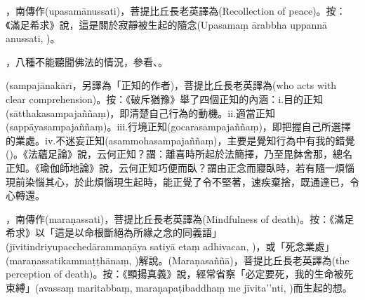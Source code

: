 \startitemgroup[noteitems]
\item{}，南傳作(upasamānussati)，菩提比丘長老英譯為(Recollection of peace)。按：《滿足希求》說，這是關於寂靜被生起的隨念(Upasamaṃ ārabbha uppannā anussati, )。
\stopitemgroup

\startitemgroup[noteitems]
\item{}，八種不能聽聞佛法的情況，參看、。
\stopitemgroup

\startitemgroup[noteitems]
\item{}(sampajānakārī，另譯為「正知的作者)，菩提比丘長老英譯為(who acts with clear comprehension)。按：《破斥猶豫》舉了四個正知的內涵：i.目的正知(sātthakasampajaññaṃ)，即清楚自己行為的動機。ii.適當正知(sappāyasampajaññaṃ)。iii.行境正知(gocarasampajaññaṃ)，即把握自己所選擇的業處。iv.不迷妄正知(asammohasampajaññaṃ)，主要是覺知行為中有我的錯覺()。《法蘊足論》說，云何正知？謂：離喜時所起於法簡擇，乃至毘鉢舍那，總名正知。《瑜伽師地論》說，云何正知巧便而臥？謂由正念而寢臥時，若有隨一煩惱現前染惱其心，於此煩惱現生起時，能正覺了令不堅著，速疾棄捨，既通達已，令心轉還。
\stopitemgroup

\startitemgroup[noteitems]
\item{}，南傳作(maraṇassati)，菩提比丘長老英譯為(Mindfulness of death)。按：《滿足希求》以「這是以命根斷絕為所緣之念的同義語」(jīvitindriyupacchedārammaṇāya satiyā etaṃ adhivacan, )，或「死念業處」(maraṇassatikammaṭṭhānaṃ, )解說。(Maraṇasaññā)，菩提比丘長老英譯為(the perception of death)。按：《顯揚真義》說，經常省察「必定要死，我的生命被死束縛」(avassaṃ maritabbaṃ, maraṇapaṭibaddhaṃ me jīvita’’nti, )而生起的想。
\stopitemgroup

